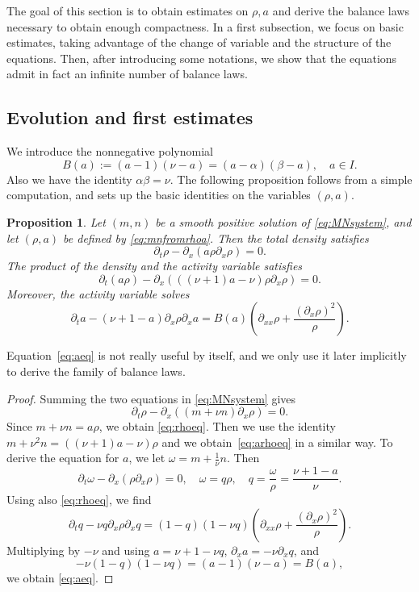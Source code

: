 \documentclass[a4paper,twosided,11pt]{article}
\newcommand{\al}{\alpha}
\newcommand{\be}{\beta}
\newcommand{\p}{\partial}
\newcommand{\1}{\mathbf{1}}
\theoremstyle{plain}
\newtheorem{proposition}[thm]{Proposition}
\theoremstyle{remark}
\numberwithin{equation}{section}
\begin{document}
The goal of this section is to obtain estimates on $\rho,a$ and derive the balance laws necessary to obtain enough compactness. In a first subsection, we focus on basic estimates, taking advantage of the change of variable and the structure of the equations. Then, after introducing some notations, we show that the equations admit in fact an infinite number of balance laws. 

\subsection{Evolution and first estimates}

We introduce the nonnegative polynomial
\begin{equation}
\label{eq:defB}
 B(a):=(a-1)(\nu-a)=(a-\al)(\be-a),
 \quad a\in I.
\end{equation}
Also we have the identity $\al\be=\nu$. The following proposition follows from a simple computation, and sets up the basic identities on the variables $(\rho,a)$.

\begin{proposition}
\label{prop:rhoa-system}
Let $(m,n)$ be a smooth positive solution of \eqref{eq:MNsystem}, and let $(\rho,a)$ be defined by \eqref{eq:mnfromrhoa}. Then the total density satisfies
\begin{equation}
\label{eq:rhoeq}
 \p_t\rho - \p_x\left(a\rho\p_x\rho\right)=0.
\end{equation}
The product of the density and the activity variable satisfies
\begin{equation}\label{eq:arhoeq}
\partial_t (a\rho ) - \partial_x(((\nu+1) a -\nu)\rho \partial_x\rho)=0.    
\end{equation}
Moreover, the activity variable solves
\begin{equation}
\label{eq:aeq}
 \p_t a - (\nu+1-a) \partial_x\rho \partial_x a
 = B(a)\left(\partial_{xx}\rho+\frac{(\partial_x\rho)^2}{\rho}\right).
\end{equation}

\end{proposition}


Equation~\eqref{eq:aeq} is not really useful by itself, and we only use it later implicitly to derive the family of balance laws.

\begin{proof}
Summing the two equations in \eqref{eq:MNsystem} gives
$$
 \p_t\rho - \p_x\left((m+\nu n) \partial_x\rho\right)=0.
$$
Since $m+\nu n=a\rho$, we obtain \eqref{eq:rhoeq}. Then we use the identity  $m+\nu^2n=((\nu+1)a-\nu)\rho$ and we obtain~\eqref{eq:arhoeq} in a similar way. To derive the equation for $a$, we let $\omega=m+\frac1\nu n.$ Then
$$
 \partial_t\omega - \p_x(\rho \partial_x\rho)=0, \quad
 \omega=q\rho, \quad q=\frac{\omega}{\rho}=\frac{\nu+1-a}{\nu}.
$$
Using also \eqref{eq:rhoeq}, we find
$$
 \partial_t q-\nu q \partial_x\rho \partial_x q=(1-q)(1-\nu q)\left(\partial_{xx}\rho+\frac{ (\partial_x\rho)^2}{\rho}\right).
$$
Multiplying by $-\nu$ and using $a=\nu+1-\nu q$, $ \partial_x a=-\nu \partial_x q$, and
$$
 -\nu(1-q)(1-\nu q)=(a-1)(\nu-a)=B(a),
$$
we obtain \eqref{eq:aeq}. 

\end{proof}
\end{document}
